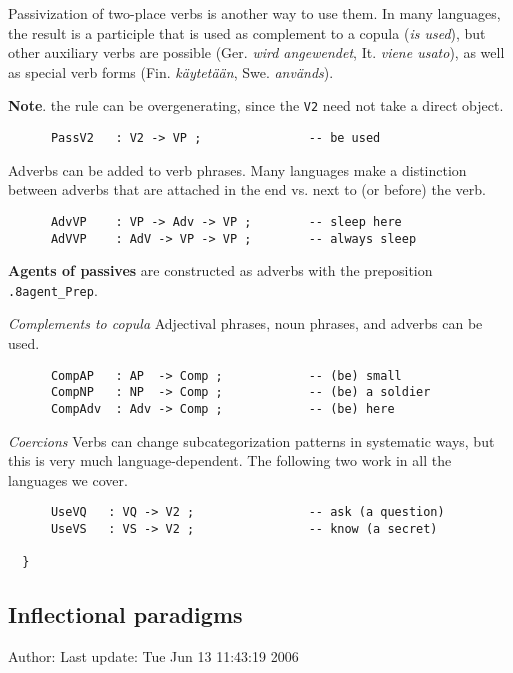\documentclass[11pt,a4paper]{article}
\newcommand{\subsubsubsection}[1]{\textit{#1}}
\begin{document}
Passivization of two-place verbs is another way to use
them. In many languages, the result is a participle that
is used as complement to a copula (\textit{is used}), but other
auxiliary verbs are possible (Ger. \textit{wird angewendet}, It.
\textit{viene usato}), as well as special verb forms (Fin. \textit{käytetään},
Swe. \textit{används}).

\textbf{Note}. the rule can be overgenerating, since the \texttt{V2} need not
take a direct object.

\begin{verbatim}
      PassV2   : V2 -> VP ;               -- be used
\end{verbatim}

Adverbs can be added to verb phrases. Many languages make
a distinction between adverbs that are attached in the end
vs. next to (or before) the verb.

\begin{verbatim}
      AdvVP    : VP -> Adv -> VP ;        -- sleep here
      AdVVP    : AdV -> VP -> VP ;        -- always sleep
\end{verbatim}

\textbf{Agents of passives} are constructed as adverbs with the
preposition \texttt{.8agent\_Prep}.

\subsubsubsection{Complements to copula}
Adjectival phrases, noun phrases, and adverbs can be used.

\begin{verbatim}
      CompAP   : AP  -> Comp ;            -- (be) small
      CompNP   : NP  -> Comp ;            -- (be) a soldier
      CompAdv  : Adv -> Comp ;            -- (be) here
\end{verbatim}

\subsubsubsection{Coercions}
Verbs can change subcategorization patterns in systematic ways,
but this is very much language-dependent. The following two
work in all the languages we cover.

\begin{verbatim}
      UseVQ   : VQ -> V2 ;                -- ask (a question)
      UseVS   : VS -> V2 ;                -- know (a secret)
  
  }
\end{verbatim}

\subsection{Inflectional paradigms}
Author: 
Last update: Tue Jun 13 11:43:19 2006
\end{document}

